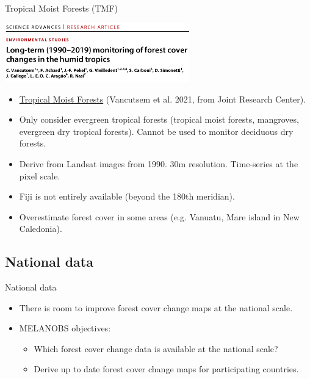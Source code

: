 \documentclass[10pt,table,dvipsnames,compress]{beamer}
\begin{document}
\begin{frame}[label={sec:org2d4c8f6}]{Tropical Moist Forests (TMF)}
\begin{center}
\includegraphics[width=8cm]{figs/fcc/Vancutsem2021.png}
\end{center}

\begin{itemize}
\item \href{https://forobs.jrc.ec.europa.eu/TMF}{Tropical Moist Forests} (Vancutsem et al. 2021, from Joint Research Center).
\item Only consider evergreen tropical forests (tropical moist forests, mangroves, evergreen dry tropical forests). Cannot be used to monitor deciduous dry forests.
\item Derive from Landsat images from 1990. 30m resolution. Time-series at the pixel scale.
\item Fiji is not entirely available (beyond the 180th meridian).
\item Overestimate forest cover in some areas (e.g. Vanuatu, Mare island in New Caledonia).
\end{itemize}
\end{frame}

\subsection{National data}
\label{sec:org6fd29ef}

\begin{frame}[label={sec:org53ea6db}]{National data}
\begin{itemize}
\item There is room to improve forest cover change maps at the national scale.

\item MELANOBS objectives:
\begin{itemize}
\item Which forest cover change data is available at the national scale?
\item Derive up to date forest cover change maps for participating countries.
\end{itemize}
\end{itemize}
\end{frame}
\end{document}
